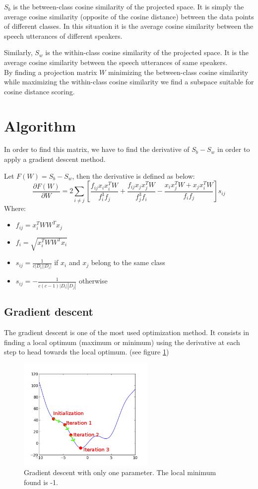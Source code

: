 \documentclass{techrep} %
\begin{document}
$S_b$ is the between-class cosine similarity of the projected
space. It is simply the average cosine similarity (opposite of the
cosine distance) between the data points of different classes. In this
situation it is the average cosine similarity between the speech
utterances of different speakers.

Similarly, $S_w$ is the within-class cosine similarity of the
projected space. It is the average cosine similarity between the
speech utterances of same speakers.\\
By finding a projection matrix $W$ minimizing the between-class cosine
similarity while maximizing the within-class cosine similarity we find
a subspace suitable for cosine distance scoring.

\section{Algorithm}

In order to find this matrix, we have to find the derivative of $S_b -
S_w$ in order to apply a gradient descent method. %

Let $F(W) = S_b - S_w$, then the derivative is defined as below:
$$\frac{\partial{F(W)}}{\partial{W}} =
2\sum_{i\neq{}j}\left[\frac{f_{ij}x_ix_i^TW}{f_i^3f_j} +
  \frac{f_{ij}x_jx_j^TW}{f_j^3f_i} - \frac{x_ix_j^TW + x_jx_i^TW}{f_if_j}\right]s_{ij}$$
Where:
\begin{itemize}
\item $f_{ij} = x_i^TWW^Tx_j$
\item $f_i = \sqrt{x_i^TWW^Tx_i}$
\item $s_{ij} = \frac{1}{c|D_i||D_i|}$ if $x_i$ and $x_j$ belong to the same class
\item $s_{ij} = -\frac{1}{c(c-1)|D_i||D_j|}$ otherwise
\end{itemize}

\subsection{Gradient descent}

The gradient descent is one of the most used optimization method. It
consists in finding a local optimum (maximum or minimum) using the
derivative at each step to head towards the local optimum. (see figure \ref{gradient_descent})

\begin{figure}[H]
  \centering
  \includegraphics[width=250px]{gradient_descent}
  \caption{Gradient descent with only one parameter. The local minimum found is -1.}
  \label{gradient_descent}
\end{figure}
\end{document}
